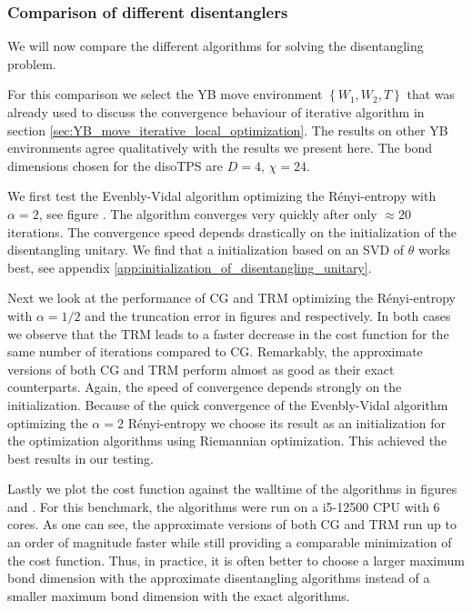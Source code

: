 \subsubsection*{Comparison of different disentanglers}
We will now compare the different algorithms for solving the disentangling problem.


For this comparison we select the YB move environment $\left\{W_1, W_2, T\right\}$ that was already used to discuss the convergence behaviour of iterative algorithm in section \ref{sec:YB_move_iterative_local_optimization}. The results on other YB environments agree qualitatively with the results we present here. The bond dimensions chosen for the disoTPS are $D = 4$, $\chi = 24$. \par
We first test the Evenbly-Vidal algorithm optimizing the Rényi-entropy with $\alpha = 2$, see figure . The algorithm converges very quickly after only $\approx 20$ iterations. The convergence speed depends drastically on the initialization of the disentangling unitary. We find that a initialization based on an SVD of $\theta$ works best, see appendix \ref{app:initialization_of_disentangling_unitary}. \par
Next we look at the performance of CG and TRM optimizing the Rényi-entropy with $\alpha = 1/2$ and the truncation error in figures  and  respectively. In both cases we observe that the TRM leads to a faster decrease in the cost function for the same number of iterations compared to CG. Remarkably, the approximate versions of both CG and TRM perform almost as good as their exact counterparts. Again, the speed of convergence depends strongly on the initialization. Because of the quick convergence of the Evenbly-Vidal algorithm optimizing the $\alpha = 2$ Rényi-entropy we choose its result as an initialization for the optimization algorithms using Riemannian optimization. This achieved the best results in our testing. \par
Lastly we plot the cost function against the walltime of the algorithms in figures  and . For this benchmark, the algorithms were run on a i5-12500 CPU with 6 cores. As one can see, the approximate versions of both CG and TRM run up to an order of magnitude faster while still providing a comparable minimization of the cost function. Thus, in practice, it is often better to choose a larger maximum bond dimension with the approximate disentangling algorithms instead of a smaller maximum bond dimension with the exact algorithms.
